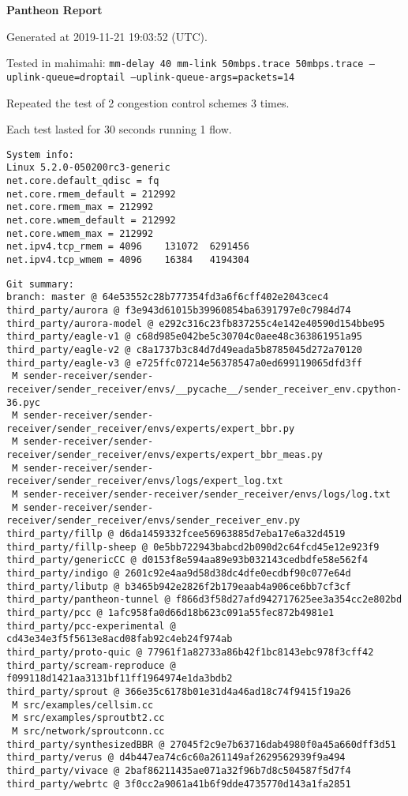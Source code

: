 \documentclass{article}
\begin{document}
\centerline{\textbf{\large{Pantheon Report}}}
\vspace{20pt}

Generated at 2019-11-21 19:03:52 (UTC).

Tested in mahimahi: \texttt{mm-delay 40 mm-link 50mbps.trace 50mbps.trace --uplink-queue=droptail --uplink-queue-args=packets=14}

Repeated the test of 2 congestion control schemes 3 times.

Each test lasted for 30 seconds running 1 flow.

\begin{verbatim}
System info:
Linux 5.2.0-050200rc3-generic
net.core.default_qdisc = fq
net.core.rmem_default = 212992
net.core.rmem_max = 212992
net.core.wmem_default = 212992
net.core.wmem_max = 212992
net.ipv4.tcp_rmem = 4096	131072	6291456
net.ipv4.tcp_wmem = 4096	16384	4194304
\end{verbatim}

\begin{verbatim}
Git summary:
branch: master @ 64e53552c28b777354fd3a6f6cff402e2043cec4
third_party/aurora @ f3e943d61015b39960854ba6391797e0c7984d74
third_party/aurora-model @ e292c316c23fb837255c4e142e40590d154bbe95
third_party/eagle-v1 @ c68d985e042be5c30704c0aee48c363861951a95
third_party/eagle-v2 @ c8a1737b3c84d7d49eada5b8785045d272a70120
third_party/eagle-v3 @ e725ffc07214e56378547a0ed699119065dfd3ff
 M sender-receiver/sender-receiver/sender_receiver/envs/__pycache__/sender_receiver_env.cpython-36.pyc
 M sender-receiver/sender-receiver/sender_receiver/envs/experts/expert_bbr.py
 M sender-receiver/sender-receiver/sender_receiver/envs/experts/expert_bbr_meas.py
 M sender-receiver/sender-receiver/sender_receiver/envs/logs/expert_log.txt
 M sender-receiver/sender-receiver/sender_receiver/envs/logs/log.txt
 M sender-receiver/sender-receiver/sender_receiver/envs/sender_receiver_env.py
third_party/fillp @ d6da1459332fcee56963885d7eba17e6a32d4519
third_party/fillp-sheep @ 0e5bb722943babcd2b090d2c64fcd45e12e923f9
third_party/genericCC @ d0153f8e594aa89e93b032143cedbdfe58e562f4
third_party/indigo @ 2601c92e4aa9d58d38dc4dfe0ecdbf90c077e64d
third_party/libutp @ b3465b942e2826f2b179eaab4a906ce6bb7cf3cf
third_party/pantheon-tunnel @ f866d3f58d27afd942717625ee3a354cc2e802bd
third_party/pcc @ 1afc958fa0d66d18b623c091a55fec872b4981e1
third_party/pcc-experimental @ cd43e34e3f5f5613e8acd08fab92c4eb24f974ab
third_party/proto-quic @ 77961f1a82733a86b42f1bc8143ebc978f3cff42
third_party/scream-reproduce @ f099118d1421aa3131bf11ff1964974e1da3bdb2
third_party/sprout @ 366e35c6178b01e31d4a46ad18c74f9415f19a26
 M src/examples/cellsim.cc
 M src/examples/sproutbt2.cc
 M src/network/sproutconn.cc
third_party/synthesizedBBR @ 27045f2c9e7b63716dab4980f0a45a660dff3d51
third_party/verus @ d4b447ea74c6c60a261149af2629562939f9a494
third_party/vivace @ 2baf86211435ae071a32f96b7d8c504587f5d7f4
third_party/webrtc @ 3f0cc2a9061a41b6f9dde4735770d143a1fa2851
\end{verbatim}
\end{document}

